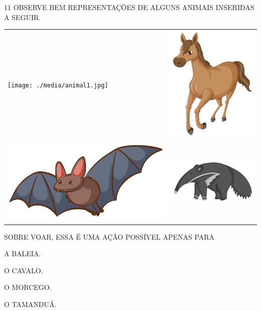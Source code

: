 \num{11} OBSERVE BEM REPRESENTAÇÕES DE ALGUNS ANIMAIS INSERIDAS A SEGUIR.

\begin{table}[H]
\centering
\begin{tabular}{ll}
\texttt{[image: ./media/animal1.jpg]} & \includegraphics[width=.25\textwidth]{./media/animal2.jpg} \\
\includegraphics[width=.35\textwidth]{./media/animal3.jpg}  & \includegraphics[width=.35\textwidth]{./media/animal4.png}
\end{tabular}
\end{table}



 
SOBRE VOAR, ESSA É UMA AÇÃO POSSÍVEL APENAS PARA

\begin{escolha}%
\item A BALEIA.

\item O CAVALO.

\item O MORCEGO.

\item O TAMANDUÁ.
\end{escolha}

